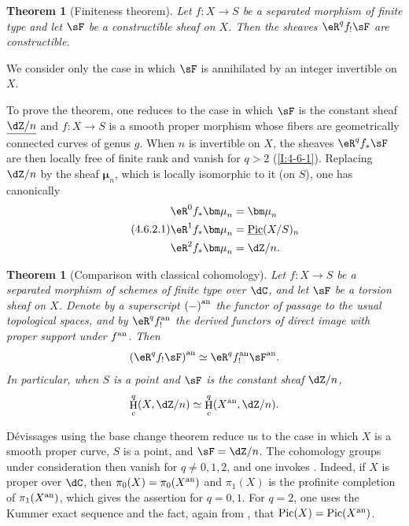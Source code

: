 \documentclass[12pt,oneside,english]{smfbook}
\DeclareMathOperator{\h}{H}
\DeclareMathOperator{\pic}{Pic}
\newcommand{\dmu}{{\bm\mu}}
\newcommand{\an}[1]{{#1}^{\textnormal{an}}}
\newcommand{\const}[1]{\underline{#1}}
\newtheorem{theorem}[subsubsection]{Theorem}
\begin{document}
\begin{theorem}[Finiteness theorem]\label{I:4-6-2}
Let $f:X\to S$ be a separated morphism of finite type and let $\sF$ be a constructible sheaf on $X$. Then the sheaves $\eR^qf_!\sF$ are constructible.
\end{theorem}

We consider only the case in which $\sF$ is annihilated by an integer invertible on $X$.

To prove the theorem, one reduces to the case in which $\sF$ is the constant sheaf $\const{\dZ/n}$ and $f:X\to S$ is a smooth proper morphism whose fibers are geometrically connected curves of genus $g$. When $n$ is invertible on $X$, the sheaves $\eR^qf_*\sF$ are then locally free of finite rank and vanish for $q>2$ (\ref{I:4-6-1}). Replacing $\dZ/n$ by the sheaf $\dmu_n$, which is locally isomorphic to it (on $S$), one has canonically
\begin{equation*}\tag{4.6.2.1}\label{I:eq:4-6-2-1}
\begin{aligned}
  \eR^0 f_* \dmu_n &= \dmu_n \\
  \eR^1 f_* \dmu_n &= \const\pic(X/S)_n \\
  \eR^2 f_* \dmu_n &= \dZ/n \text{.}
\end{aligned}
\end{equation*}

\begin{theorem}[Comparison with classical cohomology]\label{I:4-6-3}
Let $f:X\to S$ be a separated morphism of schemes of finite type over $\dC$, and let $\sF$ be a torsion sheaf on $X$. Denote by a superscript $\an{(-)}$ the functor of passage to the usual topological spaces, and by $\eR^q\an f_!$ the derived functors of direct image with proper support under $\an f$. Then
\[
  \an{(\eR^q f_! \sF)} \simeq \eR^q \an f_! \an \sF \text{.}
\]
In particular, when $S$ is a point and $\sF$ is the constant sheaf $\dZ/n$,
\[
  \h_c^q(X,\dZ/n) \simeq \h_c^q(\an X,\dZ/n)\text{.}
\]
\end{theorem}

Dévissages using the base change theorem reduce us to the case in which $X$ is a smooth proper curve, $S$ is a point, and $\sF=\dZ/n$. The cohomology groups under consideration then vanish for $q\ne0,1,2$, and one invokes \cite{se55}. Indeed, if $X$ is proper over $\dC$, then $\pi_0(X)=\pi_0(\an X)$ and $\pi_1(X)$ is the profinite completion of $\pi_1(\an X)$, which gives the assertion for $q=0,1$. For $q=2$, one uses the Kummer exact sequence and the fact, again from \cite{se55}, that $\pic(X)=\pic(\an X)$.
\end{document}
